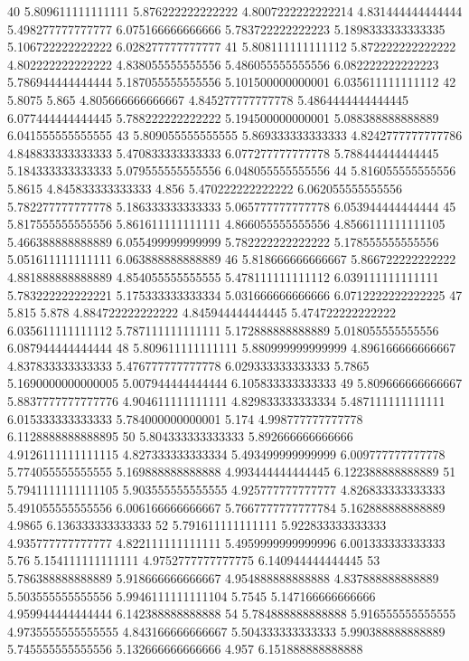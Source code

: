 40 5.809611111111111 5.876222222222222 4.8007222222222214 4.831444444444444 5.498277777777777 6.075166666666666 5.783722222222223 5.1898333333333335 5.106722222222222 6.028277777777777
41 5.808111111111112 5.872222222222222 4.802222222222222 4.838055555555556 5.486055555555556 6.082222222222223 5.786944444444444 5.187055555555556 5.101500000000001 6.035611111111112
42 5.8075 5.865 4.805666666666667 4.845277777777778 5.4864444444444445 6.077444444444445 5.788222222222222 5.194500000000001 5.088388888888889 6.041555555555555
43 5.809055555555555 5.869333333333333 4.8242777777777786 4.848833333333333 5.470833333333333 6.077277777777778 5.788444444444445 5.184333333333333 5.079555555555556 6.048055555555556
44 5.816055555555556 5.8615 4.845833333333333 4.856 5.470222222222222 6.062055555555556 5.782277777777778 5.186333333333333 5.065777777777778 6.053944444444444
45 5.817555555555556 5.861611111111111 4.866055555555556 4.8566111111111105 5.466388888888889 6.055499999999999 5.782222222222222 5.178555555555556 5.051611111111111 6.063888888888889
46 5.818666666666667 5.866722222222222 4.881888888888889 4.854055555555555 5.478111111111112 6.039111111111111 5.783222222222221 5.175333333333334 5.031666666666666 6.0712222222222225
47 5.815 5.878 4.884722222222222 4.845944444444445 5.474722222222222 6.035611111111112 5.787111111111111 5.172888888888889 5.018055555555556 6.087944444444444
48 5.809611111111111 5.880999999999999 4.896166666666667 4.837833333333333 5.476777777777778 6.029333333333333 5.7865 5.1690000000000005 5.007944444444444 6.105833333333333
49 5.809666666666667 5.8837777777777776 4.904611111111111 4.829833333333334 5.487111111111111 6.015333333333333 5.784000000000001 5.174 4.998777777777778 6.1128888888888895
50 5.804333333333333 5.892666666666666 4.9126111111111115 4.827333333333334 5.493499999999999 6.009777777777778 5.774055555555555 5.169888888888888 4.993444444444445 6.122388888888889
51 5.7941111111111105 5.903555555555555 4.925777777777777 4.826833333333333 5.491055555555556 6.006166666666667 5.7667777777777784 5.162888888888889 4.9865 6.136333333333333
52 5.791611111111111 5.922833333333333 4.935777777777777 4.822111111111111 5.4959999999999996 6.001333333333333 5.76 5.154111111111111 4.9752777777777775 6.140944444444445
53 5.786388888888889 5.918666666666667 4.954888888888888 4.837888888888889 5.503555555555556 5.9946111111111104 5.7545 5.147166666666666 4.959944444444444 6.142388888888888
54 5.784888888888888 5.916555555555555 4.9735555555555555 4.843166666666667 5.504333333333333 5.990388888888889 5.745555555555556 5.132666666666666 4.957 6.151888888888888

